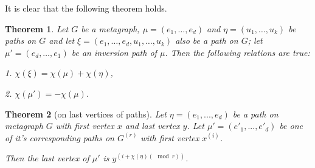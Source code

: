 \documentclass[14pt]{mmcs-article}
\newtheorem{theorem}{Theorem}
\begin{document}
It is clear that the following theorem holds.

\begin{theorem} \label{glued_paths}
    Let $G$ be a metagraph, $\mu = (e_1, \dots, e_d)$ and $\eta = (u_1, \dots, u_k)$ be paths on $G$ and let $\xi = (e_1, \dots, e_d, u_1, \dots, u_k)$ also be a path on $G$; let $\mu' = (e_d, \dots, e_1)$ be an inversion path of $\mu$. Then the following relations are true:

    1. $ \chi(\xi) = \chi(\mu) + \chi(\eta)$,

    2. $ \chi(\mu') = -\chi(\mu)$.
\end{theorem}

\begin{theorem}[on last vertices of paths]\label{theorem_last_vertices}
    Let $\eta = (e_1, ..., e_d)$ be a path on metagraph $G$ with first vertex $x$ and last vertex $y$. Let $\mu' = (e'_1, ..., e'_d)$ be one of it's corresponding paths on $G^{(r)}$ with first vertex $x^{(i)}$.
    
    Then the last vertex of $\mu'$ is $y^{(i + \chi(\eta) (\mod{r}))}$.
    
\end{theorem}
    
\end{document}
